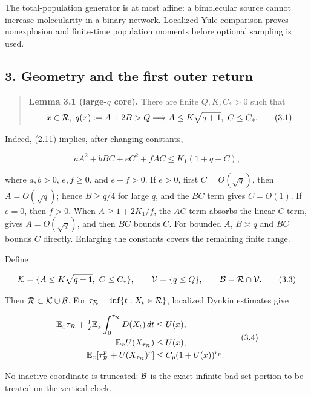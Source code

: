 The total-population generator is at most affine: a bimolecular source
cannot increase molecularity in a binary network. Localized Yule
comparison proves nonexplosion and finite-time population moments before
optional sampling is used.

\subsection{3. Geometry and the first outer
return}

\begin{quote}
\textbf{Lemma 3.1 (large-\(q\) core).} There are finite \(Q,K,C_*>0\)
such that \[
x\in{\cal R},\ q(x):=A+2B>Q
\Longrightarrow A\le K\sqrt{q+1},\ C\le C_* .           \tag{3.1}
\]
\end{quote}

Indeed, (2.11) implies, after changing constants,

\[
 aA^2+bBC+eC^2+fAC\le K_1(1+q+C),                        \tag{3.2}
\]

where \(a,b>0\), \(e,f\ge0\), and \(e+f>0\). If \(e>0\), first
\(C=O(\sqrt q)\), then \(A=O(\sqrt q)\); hence \(B\ge q/4\) for large
\(q\), and the \(BC\) term gives \(C=O(1)\). If \(e=0\), then \(f>0\).
When \(A\ge1+2K_1/f\), the \(AC\) term absorbs the linear \(C\) term,
gives \(A=O(\sqrt q)\), and then \(BC\) bounds \(C\). For bounded \(A\),
\(B\asymp q\) and \(BC\) bounds \(C\) directly. Enlarging the constants
covers the remaining finite range.

Define

\[
 {\cal K}=\{A\le K\sqrt{q+1},\ C\le C_*\},\qquad
 {\cal V}=\{q\le Q\},\qquad
 {\cal B}={\cal R}\cap{\cal V}.                           \tag{3.3}
\]

Then \({\cal R}\subset{\cal K}\cup{\cal B}\). For
\(\tau_{\cal R}=\inf\{t:X_t\in{\cal R}\}\), localized Dynkin estimates
give

\[
\begin{split}
 \mathbb E_x\tau_{\cal R}+\tfrac12\mathbb E_x
       \int_0^{\tau_{\cal R}}D(X_t)\,dt&\le U(x),\\
 \mathbb E_xU(X_{\tau_{\cal R}})&\le U(x),\\
 \mathbb E_x[\tau_{\cal R}^p+U(X_{\tau_{\cal R}})^p]
 &\le C_p(1+U(x))^{r_p}.
\end{split}                                               \tag{3.4}
\]

No inactive coordinate is truncated: \({\cal B}\) is the exact infinite
bad-set portion to be treated on the vertical clock.

